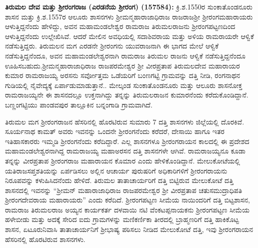 \textbf{ ತಿರುಮಲ ದೇವ ಮತ್ತು ಶ‍್ರೀರಂಗರಾಜ (ಎರಡನೆಯ ಶ‍್ರೀರಂಗ) (157584): } ಕ್ರಿ.ಶ.1550ರ ಸುಂಕಾತೊಂಡನೂರು ಶಾಸನ ಮತ್ತು ಕ್ರಿ.ಶ.1557ರ ಆಲೂರು ಶಾಸನಗಳು ಶ‍್ರೀಮನ್ಮಹಾರಾಜಾಧಿರಾಜ ರಾಜರಾಜಶ‍್ರೀ ಶ‍್ರೀರಂಗಮಹಾರಾಯರು ಆಳುತ್ತಿದ್ದನೆಂದು ಹೇಳಿದ್ದು, ಅವನ ಮಹಾಮಂಡಲೇಶ್ವರ ರಾಮರಾಜ ತಿರುಮಲರಾಜನು ಶ‍್ರೀರಂಗಪಟ್ಟಣದಿಂದ ಆಳುತ್ತಿದ್ದನೆಂದು ಉಲ್ಲೇಖಿಸಿವೆ. ಆದರೆ ಮೇಲಿನ ಅವಧಿಯಲ್ಲಿ ಸದಾಶಿವರಾಯ ಮತ್ತು ಅಳಿಯ ರಾಮರಾಯರೇ ಆಳ್ವಿಕೆ ನಡೆಸುತ್ತಿದ್ದರು. ತಿರುಮಲನ ಮಗ ಎರಡನೇ ಶ‍್ರೀರಂಗನು ಯುವರಾಜನಾಗಿ ಈ ಭಾಗದ ಮೇಲೆ ಆಳ್ವಿಕೆ ನಡೆಸುತ್ತಿದ್ದನೆಂದೂ, ಅವನ ಮಹಾಮಂಡಲೇಶ್ವರನಾಗಿ ರಾಮರಾಜ ತಿರುಮಲ ರಾಜನು ಆಳ್ವಿಕೆ ನಡೆಸುತ್ತಿದ್ದನೆಂದೂ ಊಹಿಸಬಹುದು.\break ಶ‍್ರೀಮನ್ಮಹಾರಾಜಾಧಿರಾಜ ರಾಜಪರಮೇಶ್ವರ ಶ‍್ರೀ ವೀರಪ್ರತಾಪ ತಿರುಮಲದೇವ ಮಹಾರಾಯರ ಕುಮಾರ ರಾಮರಾಜಯ್ಯ ಅರಸನು ಸರ್ವೋತ್ತಮ ಒಡೆಯರಿಗೆ ಬಂಣಗಟ್ಟಿ ಗ್ರಾಮವನ್ನು ದತ್ತಿ ನೀಡಿ, ರಂಗನಾಥನ ಗುಡಿಯಲ್ಲಿ ನೈವೇದ್ಯಕ್ಕೆ ಏರ್ಪಾಡು\-ಮಾಡುತ್ತಾನೆ.. ಮೇಲ್ಕಂಡ ಸುಂಕಾತೊಂಡನೂರು ಮತ್ತು ಆಲೂರು ಶಾಸನೋಕ್ತ ರಾಮರಾಜಯ್ಯನೇ ಈ ಶಾಸನದಲ್ಲೂ ಉಕ್ತನಾಗಿದ್ದು ತನ್ನನ್ನು ತಿರುಮಲರಾಜನ ಕುಮಾರನೆಂದು ಕರೆದುಕೊಂಡಿದ್ದಾನೆ. ಬಣ್ಣಂಗಟ್ಟಿಯು ಪಾಂಡವಪುರ ತಾಲ್ಲೂಕಿನ ಬನ್ನಂಗಾಡಿ ಗ್ರಾಮವಾಗಿದೆ. 

ತಿರುಮಲ ಮಗ ಶ‍್ರೀರಂಗರಾಜನ ಹೆಸರಿನಲ್ಲಿ ಹೊರಟಿರುವ ಸುಮಾರು 7 ದತ್ತಿ ಶಾಸನಗಳು ಜಿಲ್ಲೆಯಲ್ಲಿ ದೊರಕಿವೆ. ಸೂರ್ಯನಾಥ ಕಾಮತ್​ ಅವರು ಇವನನ್ನು ಒಂದನೇ ಶ‍್ರೀರಂಗನೆಂದು ಕರೆದರೆ, ದೇಸಾಯಿ ಹಾಗೂ ಇತರ ಇತಿಹಾಸಕಾರರು ಇಮ್ಮಡಿ ಶ‍್ರೀರಂಗನೆಂದು ಕರೆದಿದ್ದಾರೆ. ಎಲ್ಲ ಶಾಸನಗಳೂ ಶ‍್ರೀರಂಗರಾಯನ ಕಾಲದಲ್ಲಿ ಈ ಪ್ರದೇಶದ ಮಹಾಮಂಡಲೇಶ್ವರ\-ನಾಗಿದ್ದ ರಾಮರಾಜಯ್ಯ ಮಹಾಅರಸನ ದತ್ತಿ ಶಾಸನಗಳೇ ಆಗಿವೆ. ರಾಮರಾಜಯ್ಯನೂ ಕೂಡಾ ತನ್ನನ್ನು ವೀರಪ್ರತಾಪ ಶ‍್ರೀರಂಗರಾಜ ಮಹಾರಾಯನ ಕೊಮಾರ ಎಂದು ಹೇಳಿಕೊಂಡಿದ್ದಾನೆ. ಮೇಲುಕೋಟೆಯಲ್ಲಿ ಯತಿರಾಜಸಪ್ತಶತಿಯನ್ನು ಏರ್ಪಡಿಸಲು ಅಲ್ಲಿನ ಆಚಾರ್ಯ ಪುರುಷರಿಗೆ ಅಧಿಕಾರಿಗಳಿಗೆ ಶ‍್ರೀರಂಗರಾಯನು ನಿರೂಪವನ್ನು ಕಳುಹಿಸಿದನೆಂದು ಹೇಳಿದೆ. ತಿರುಮಲ ತಾತಾಚಾರ್ಯರಿಗೆ ದತ್ತಿ ಬಿಟ್ಟಿರುವ ಮೇಲುಕೋಟೆ ದತ್ತಿ ಶಾಸನದಲ್ಲಿ ಇವನನ್ನು “ಶ‍್ರೀಮನ್​ ಮಹಾರಾಜಾಧಿರಾಜ ರಾಜಪರಮೇಶ್ವರ ಶ‍್ರೀ ವೀರಪ್ರತಾಪ ಚತುಸಮುದ್ರಾಧಿಪತಿ ಶ‍್ರೀರಂಗದೇವರಾಯ ಮಹಾರಾಯರು” ಎಂದು ಕರೆದಿದೆ. ಶ‍್ರೀರಂಗಪಟ್ಟಣ ಸೀಮೆಯ ನಾಯಿಂದರಿಗೆ ದತ್ತಿ ಬಿಟ್ಟಶಾಸನ, ರಾಮರಾಜ ತಿರುಮಲರಾಜ ಅಯ್ಯನ ಕಾರ್ಯಕರ್ತ ದಳವಾಯಿ ನಟಿ ವೆಂಕಟಪ್ಪನಾಯಕನು ಶ‍್ರೀರಂಗಪಟ್ಟಣ ಸೀಮೆಯ ಹಳೇಬೀಡು ಮತ್ತು ಅದಕ್ಕೆ ಸೇರಿದ ಐದು ಗ್ರಾಮಗಳನ್ನು ಮಣಿಕರ್ಣಿಕಾ ತೀರದಲ್ಲಿ ಬ್ರಾಹ್ಮಣರಿಗೆ ದತ್ತಿ ಹಾಕಿಕೊಟ್ಟ ಶಾಸನ, ಏಟೂರುನಿವಾಸಿ ತಾತಾಚಾರ್ಯನಿಗೆ ಶ‍್ರೀಭಾಷ್ಯ ಪಠಿಸಲು ನೀಡಿದ ಮೇಲುಕೋಟೆ ದತ್ತಿ, ಇವು ಶ‍್ರೀರಂಗರಾಯನ ಹೆಸರಿನಲ್ಲಿ ಹೊರಟಿರುವ ಶಾಸನಗಳು.

